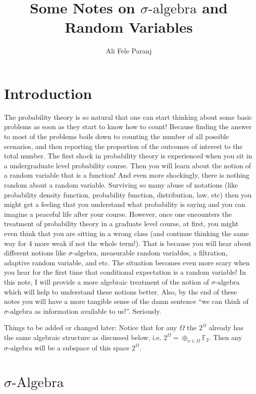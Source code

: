 \documentclass[11pt,a4paper]{article}
\title{Some Notes on $\sigma\text{-algebra}$ and Random Variables}
\author{Ali Fele Paranj}
\theoremstyle{definition}
\theoremstyle{remark}
\begin{document}
	
	\maketitle
	
	
	\section{Introduction}
	The probability theory is so natural that one can start thinking about some basic problems as soon as they start to know how to count! Because finding the answer to most of the problems boils down to counting the number of all possible scenarios, and then reporting the proportion of the outcomes of interest to the total number. The first shock in probability theory is experienced when you sit in a undergraduate level probability course. Then you will learn about the notion of a random variable that is a function! And even more shockingly, there is nothing random about a random variable. Surviving so many abuse of notations (like probability density function, probability function, distribution, law, etc) then you might get a feeling that you understand what probability is saying and you can imagine a peaceful life after your course. However, once one encounters the treatment of probability theory in a graduate level course, at first, you might even think that you are sitting in a wrong class (and continue thinking the same way for 4 more weak if not the whole term!). That is because you will hear about different notions like $\sigma\text{-algebra}$, measurable random variables, a filtration, adaptive random variable, and etc. The situation becomes even more scary when you hear for the first time that conditional expectation is a random variable! In this note, I will provide a more algebraic treatment of the notion of $\sigma\text{-algebra}$ which will help to understand these notions better. Also, by the end of these notes you will have a more tangible sense of the damn sentence ``we can think of $\sigma\text{-algebra}$ as information available to us!''. Seriously.
	
	{\color{red} \noindent Things to be added or changed later:} Notice that for any $ \Omega $ the $ 2^\Omega $ already has the same algebraic structure as discussed below, i.e. $ 2^\Omega = \oplus_{x\in\Omega}\mathbb{F}_2 $. Then any $\sigma\text{-algebra}$ will be a subspace of this space $ 2^\Omega $.
	
	
	\section{$\sigma\text{-Algebra}$}
	
\end{document}
